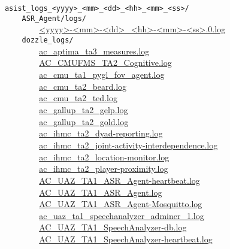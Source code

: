 \verb|      asist_logs_<yyyy>_<mm>_<dd>_<hh>_<mm>_<ss>/|\\
\verb|          ASR_Agent/logs/|\\
\verb|              |\hyperref[ASR Agent logs]{<yyyy>-<mm>-<dd>\_<hh>-<mm>-<ss>.0.log}\\
\verb|          dozzle_logs/|\\
\verb|              |\hyperref[ac_aptima_ta3_measures.log]{ac\_aptima\_ta3\_measures.log}\\
\verb|              |\hyperref[AC_CMUFMS_TA2_Cognitive.log]{AC\_CMUFMS\_TA2\_Cognitive.log}\\
\verb|              |\hyperref[ac_cmu_ta1_pygl_fov_agent.log]{ac\_cmu\_ta1\_pygl\_fov\_agent.log}\\
\verb|              |\hyperref[ac_cmu_ta2_beard.log]{ac\_cmu\_ta2\_beard.log}\\
\verb|              |\hyperref[ac_cmu_ta2_ted.log]{ac\_cmu\_ta2\_ted.log}\\
\verb|              |\hyperref[ac_gallup_ta2_gelp.log]{ac\_gallup\_ta2\_gelp.log}\\
\verb|              |\hyperref[ac_gallup_ta2_gold.log]{ac\_gallup\_ta2\_gold.log}\\
\verb|              |\hyperref[ac_ihmc_ta2_dyad-reporting.log]{ac\_ihmc\_ta2\_dyad-reporting.log}\\
\verb|              |\hyperref[ac_ihmc_ta2_joint-activity-interdependence.log]{ac\_ihmc\_ta2\_joint-activity-interdependence.log}\\
\verb|              |\hyperref[ac_ihmc_ta2_location-monitor.log]{ac\_ihmc\_ta2\_location-monitor.log}\\
\verb|              |\hyperref[ac_ihmc_ta2_player-proximity.log]{ac\_ihmc\_ta2\_player-proximity.log}\\
\verb|              |\hyperref[AC_UAZ_TA1_ASR_Agent-heartbeat.log]{AC\_UAZ\_TA1\_ASR\_Agent-heartbeat.log}\\
\verb|              |\hyperref[AC_UAZ_TA1_ASR_Agent.log]{AC\_UAZ\_TA1\_ASR\_Agent.log}\\
\verb|              |\hyperref[AC_UAZ_TA1_ASR_Agent-Mosquitto.log]{AC\_UAZ\_TA1\_ASR\_Agent-Mosquitto.log}\\
\verb|              |\hyperref[ac_uaz_ta1_speechanalyzer_adminer_1.log]{ac\_uaz\_ta1\_speechanalyzer\_adminer\_1.log}\\
\verb|              |\hyperref[AC_UAZ_TA1_SpeechAnalyzer-db.log]{AC\_UAZ\_TA1\_SpeechAnalyzer-db.log}\\
\verb|              |\hyperref[AC_UAZ_TA1_SpeechAnalyzer-heartbeat.log]{AC\_UAZ\_TA1\_SpeechAnalyzer-heartbeat.log}\\
